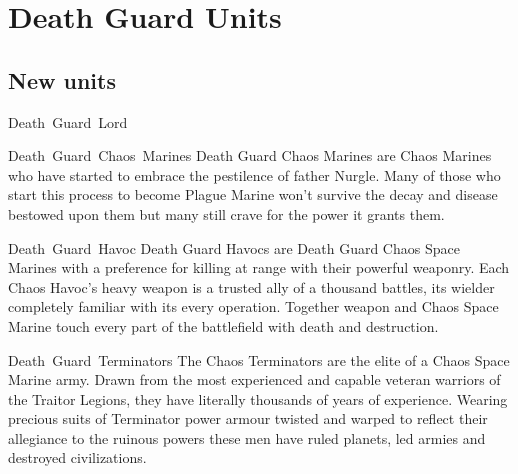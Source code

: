 \documentclass[a4paper, twocolumn]{article}
\begin{document}
%
\clearpage \onecolumn
\section{Death Guard Units}

\subsection{New units}

\unit{Death Guard Lord}{}
\statsEND

\unit{Death Guard Chaos Marines}{
  Death Guard Chaos Marines are Chaos Marines who have started to embrace the pestilence of father Nurgle. Many of
  those who start this process to become Plague Marine won't survive the decay and disease bestowed upon them
  but many still crave for the power it grants them.
}
\statsEND

\unit{Death Guard Havoc} {
Death Guard Havocs are Death Guard Chaos Space Marines with a preference for killing at range with their powerful weaponry. Each
Chaos Havoc's heavy weapon is a trusted ally of a thousand battles, its wielder completely familiar with its every operation.
Together weapon and Chaos Space Marine touch every part of the battlefield with death and destruction.
}
\statsEND

\unit{Death Guard Terminators} {
The Chaos Terminators are the elite of a Chaos Space Marine army. Drawn from the most experienced and capable veteran warriors of
the Traitor Legions, they have literally thousands of years of experience. Wearing precious suits of Terminator power armour
twisted and warped to reflect their allegiance to the ruinous powers these men have ruled planets, led armies and destroyed
civilizations.
}
\statsEND
\end{document}
